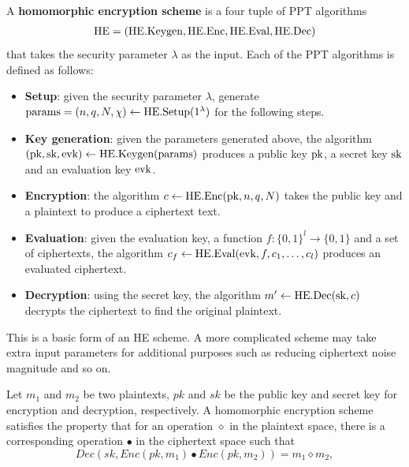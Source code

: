 \documentclass[../main.tex]{subfiles}
\begin{document}
\begin{definition}
A \textbf{homomorphic encryption scheme} is a four tuple of PPT algorithms 
\begin{align*}
    \text{HE}=(\text{HE}.\text{Keygen},\text{HE}.\text{Enc},\text{HE}.\text{Eval},\text{HE}.\text{Dec})
\end{align*}
that takes the security parameter $\lambda$ as the input. Each of the PPT algorithms is defined as follows: 
\begin{itemize}
    \item \textbf{Setup}: given the security parameter $\lambda$, generate $\text{params}=(n,q,N,\chi) \leftarrow \text{HE}.\text{Setup}(1^{\lambda})$ for the following steps.
    
    \item \textbf{Key generation}: given the parameters generated above, the algorithm $(\text{pk},\text{sk},\text{evk}) \leftarrow \text{HE}.\text{Keygen}(\text{params})$ produces a public key $\text{pk}$, a secret key $\text{sk}$ and an evaluation key $\text{evk}$.
    
    \item \textbf{Encryption}: the algorithm $c \leftarrow \text{HE}.\text{Enc}(\text{pk},n,q,N)$ takes the public key and a plaintext to produce a ciphertext text. 
    
    \item \textbf{Evaluation}: given the evaluation key, a function $f : \{0,1\}^l \rightarrow \{0,1\}$ and a set of ciphertexts, the algorithm $c_f \leftarrow \text{HE}.\text{Eval}(\text{evk},f,c_1,\dots,c_l)$ produces an evaluated ciphertext. 
    
    \item \textbf{Decryption}: using the secret key, the algorithm $m' \leftarrow \text{HE}.\text{Dec}(\text{sk},c)$ decrypts the ciphertext to find the original plaintext. 

\end{itemize}
\end{definition}
This is a basic form of an HE scheme. A more complicated scheme may take extra input parameters for additional purposes such as reducing ciphertext noise magnitude and so on. 

Let $m_1$ and $m_2$ be two plaintexts, $pk$ and $sk$ be the public key and secret key for encryption and decryption, respectively. A homomorphic encryption scheme satisfies the property that for an operation $\diamond$ in the plaintext space, there is a corresponding operation $\bullet$ in the ciphertext space such that  
\begin{equation}
\label{eq:he}
    Dec(sk,Enc(pk,m_1) \bullet Enc(pk,m_2)) = m_1 \diamond m_2,
\end{equation}
\end{document}
